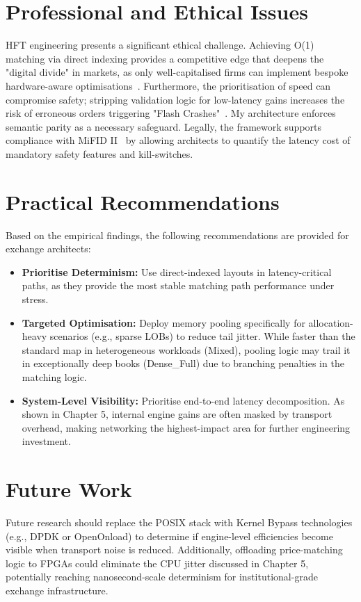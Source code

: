 \section{Professional and Ethical Issues}
HFT engineering presents a significant ethical challenge. Achieving O(1) 
matching via direct indexing provides a competitive edge that deepens the 
"digital divide" in markets, as only well-capitalised firms can implement 
bespoke hardware-aware optimisations~\citep{lewis2014flash}. 
Furthermore, the prioritisation of speed can compromise safety; stripping 
validation logic for low-latency gains increases the risk of erroneous orders 
triggering "Flash Crashes"~\citep{kirilenko2017flash}. My architecture 
enforces semantic parity as a necessary safeguard. Legally, the framework 
supports compliance with MiFID II~\citep{mifid2} by allowing architects to 
quantify the latency cost of mandatory safety features and kill-switches.

\section{Practical Recommendations}
Based on the empirical findings, the following recommendations are provided for exchange architects:

\begin{itemize}
    \item \textbf{Prioritise Determinism:} Use direct-indexed layouts in latency-critical paths, as they provide the most stable matching path performance under stress.

    \item \textbf{Targeted Optimisation:} Deploy memory pooling specifically for allocation-heavy scenarios (e.g., sparse LOBs) to reduce tail jitter. While faster than the standard map in heterogeneous workloads (Mixed), pooling logic may trail it in exceptionally deep books (Dense\_Full) due to branching penalties in the matching logic.

    \item \textbf{System-Level Visibility:} Prioritise end-to-end latency decomposition. As shown in Chapter 5, internal engine gains are often masked by transport overhead, making networking the highest-impact area for further engineering investment.
\end{itemize}

\section{Future Work}
Future research should replace the POSIX stack with Kernel Bypass 
technologies (e.g., DPDK or OpenOnload) to determine if engine-level 
efficiencies become visible when transport noise is reduced. Additionally, 
offloading price-matching logic to FPGAs could eliminate the CPU jitter 
discussed in Chapter 5, potentially reaching nanosecond-scale determinism 
for institutional-grade exchange infrastructure.

